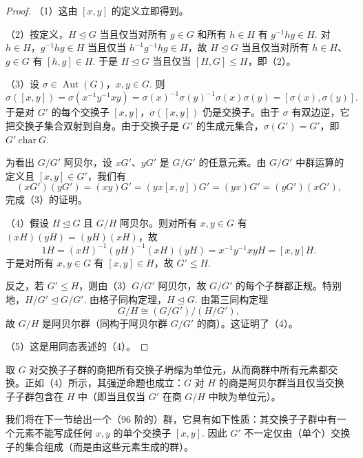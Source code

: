 \begin{proof}
（1）这由 \([x, y]\) 的定义立即得到。

（2）按定义，\(H \trianglelefteq G\) 当且仅当对所有 \(g \in G\) 和所有 \(h \in H\) 有 \(g^{-1}hg \in H\). 对 \(h \in H\)，\(g^{-1}hg \in H\) 当且仅当 \(h^{-1}g^{-1}hg \in H\)，故 \(H \trianglelefteq G\) 当且仅当对所有 \(h \in H\)、\(g \in G\) 有 \([h, g] \in H\). 于是 \(H \trianglelefteq G\) 当且仅当 \([H, G] \leq H\)，即（2）。

（3）设 \(\sigma \in \operatorname{Aut}(G)\)，\(x, y \in G\). 则
\[
\sigma([x, y]) = \sigma(x^{-1}y^{-1}xy) = \sigma(x)^{-1}\sigma(y)^{-1}\sigma(x)\sigma(y) = [\sigma(x), \sigma(y)].
\]
于是对 \(G'\) 的每个交换子 \([x, y]\)，\(\sigma([x, y])\) 仍是交换子。由于 \(\sigma\) 有双边逆，它把交换子集合双射到自身。由于交换子是 \(G'\) 的生成元集合，\(\sigma(G') = G'\)，即 \(G'\ \mathrm{char}\ G\).

为看出 \(G/G'\) 阿贝尔，设 \(xG'\)、\(yG'\) 是 \(G/G'\) 的任意元素。由 \(G/G'\) 中群运算的定义且 \([x, y] \in G'\)，我们有
\[
(xG')(yG') = (xy)G' = (yx[x, y])G' = (yx)G' = (yG')(xG'),
\]
完成（3）的证明。

（4）假设 \(H \trianglelefteq G\) 且 \(G/H\) 阿贝尔。则对所有 \(x, y \in G\) 有 \((xH)(yH) = (yH)(xH)\)，故
\[
1H = (xH)^{-1}(yH)^{-1}(xH)(yH) = x^{-1}y^{-1}xyH = [x, y]H.
\]
于是对所有 \(x, y \in G\) 有 \([x, y] \in H\)，故 \(G' \leq H\).

反之，若 \(G' \leq H\)，则由（3）\(G/G'\) 阿贝尔，故 \(G/G'\) 的每个子群都正规。特别地，\(H/G' \trianglelefteq G/G'\). 由格子同构定理，\(H \trianglelefteq G\). 由第三同构定理
\[
G/H \cong (G/G')/(H/G'),
\]
故 \(G/H\) 是阿贝尔群（同构于阿贝尔群 \(G/G'\) 的商）。这证明了（4）。

（5）这是用同态表述的（4）。
\end{proof}

取 \(G\) 对交换子子群的商把所有交换子坍缩为单位元，从而商群中所有元素都交换。正如（4）所示，其强逆命题也成立：\(G\) 对 \(H\) 的商是阿贝尔群当且仅当交换子子群包含在 \(H\) 中（即当且仅当 \(G'\) 在商 \(G/H\) 中映为单位元）。

我们将在下一节给出一个（96 阶的）群，它具有如下性质：其交换子子群中有一个元素不能写成任何 \(x, y\) 的单个交换子 \([x, y]\). 因此 \(G'\) 不一定仅由（单个）交换子的集合组成（而是由这些元素生成的群）。

